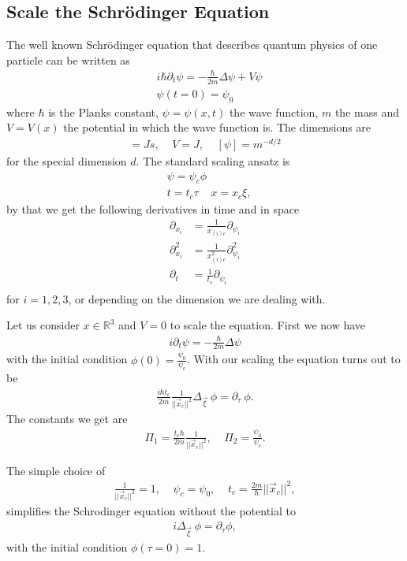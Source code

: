 \documentclass[a4paper]{article}
\begin{document}
\subsection{Scale the Schrödinger Equation}
The well known Schrödinger equation that describes quantum physics of one
particle can be written as
\begin{align}
    &i\hbar \partial_t\psi = -\frac{\hbar}{2m}\Delta \psi + V\psi \nonumber\\
    &\psi(t=0) =\psi_0
\end{align}
where $\hbar$ is the Planks constant, $\psi=\psi(x, t)$ the wave function,
$m$ the mass and $V = V(x)$ the potential in which the wave function is. The
dimensions are
\begin{align}
    [\hbar] = Js, \;\;\;\; V = J,  \;\;\;\; [\psi]= m^{-d/2}
\end{align}
for the special dimension $d$. The standard scaling ansatz is
\begin{align}
    &\psi = \psi_c \phi \\
    &t = t_c \tau \;\;\;\; x = x_c \xi,
\end{align}
by that we get the following derivatives in time and in space
\begin{align}
    \partial_{x_i} &=\frac{1}{x_{(i)c}} \partial_{\psi_i} \\
    \partial^2_{x_i} &=\frac{1}{x_{(i)c}^2} \partial_{\psi_i}^2\\
    \partial_{t} &=\frac{1}{t_c} \partial_{\psi_i} \\
\end{align}
for $i = 1, 2, 3$, or depending on the dimension we are dealing with.

Let us consider $x\in \mathbb{R}^3$ and $V = 0$ to scale the equation. First
we now have
\begin{align}
    i \partial_t\psi = -\frac{\hbar}{2m}\Delta \psi
\end{align}
with the initial condition $\phi(0) = \frac{\psi_0}{\psi_c}$. With our scaling the equation turns out to be
\begin{align}
    \frac{i\hbar t_c}{2m}\frac{1}{||\vec{x}_c||^2}\Delta_{\vec{\xi}}\ \phi =
    \partial_\tau\ \phi.
\end{align}
The constants we get are
\begin{align}
    \Pi_1 = \frac{t_c\hbar}{2m}\frac{1}{||\vec{x}_c||^2}, \;\;\;\; \Pi_2 =
    \frac{\psi_0}{\psi_c}.
\end{align}

The simple choice of
\begin{align}
    \frac{1}{||\vec{x}_c||^2} = 1, \;\;\;\; \psi_c = \psi_0, \;\;\;\; t_c =
    \frac{2m}{\hbar}||\vec{x}_c||^2,
\end{align}
simplifies the Schrodinger equation without the potential to
\begin{align}
    i\Delta_{\vec{\xi}}\ \phi = \partial_\tau \phi,
\end{align}
with the initial condition $\phi(\tau=0) = 1$.
\end{document}
